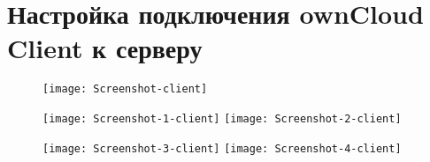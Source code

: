 \section{Настройка подключения ownCloud Client к серверу} \label{pril:d}

\begin{figure}[ht]
    \centering
	\texttt{[image: Screenshot-client]}
\end{figure}

\begin{figure}[ht]
    \centering
    \texttt{[image: Screenshot-1-client]}
	\texttt{[image: Screenshot-2-client]}
\end{figure}

\begin{figure}[ht]
    \centering
    \texttt{[image: Screenshot-3-client]}
	\texttt{[image: Screenshot-4-client]}
\end{figure}

\clearpage
